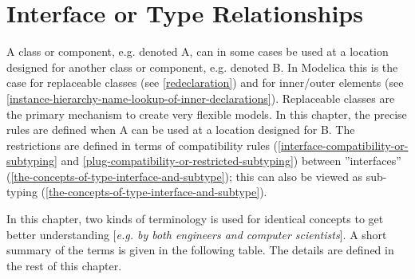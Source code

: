 \chapter{Interface or Type Relationships}

A class or component, e.g. denoted A, can in some cases be used at a
location designed for another class or component, e.g. denoted B. In
Modelica this is the case for replaceable classes (see \ref{redeclaration}) and
for inner/outer elements (see \ref{instance-hierarchy-name-lookup-of-inner-declarations}).
Replaceable classes are the
primary mechanism to create very flexible models. In this chapter, the
precise rules are defined when A can be used at a location designed for
B. The restrictions are defined in terms of compatibility rules
(\ref{interface-compatibility-or-subtyping} and \ref{plug-compatibility-or-restricted-subtyping}) between ''interfaces'' (\ref{the-concepts-of-type-interface-and-subtype}); this can
also be viewed as sub-typing (\ref{the-concepts-of-type-interface-and-subtype}).

In this chapter, two kinds of terminology is used for identical concepts
to get better understanding {[}\emph{e.g. by both engineers and computer
scientists}{]}. A short summary of the terms is given in the following
table. The details are defined in the rest of this chapter.

